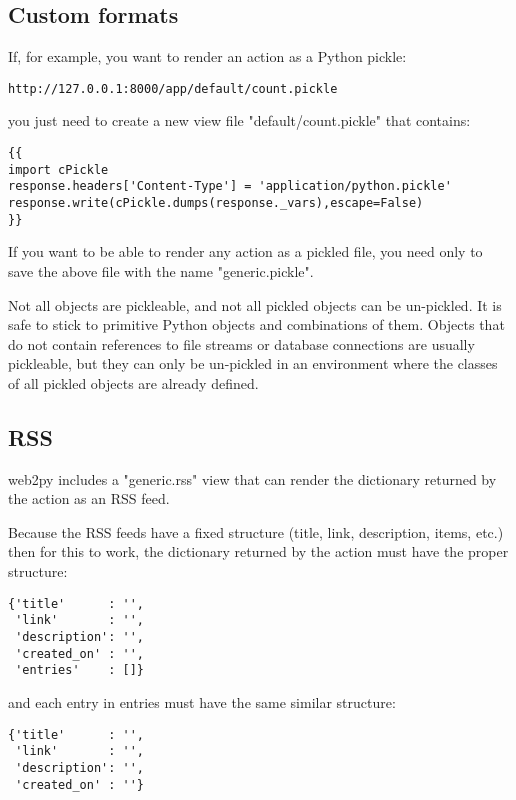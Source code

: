 \documentclass[justified,sixbynine,notoc]{tufte-book}
\def\inxx#1{\index{#1}}
\begin{document}
\begin{fullwidth}
\goodbreak\subsection{Custom formats}

If, for example, you want to render an action as a Python pickle:

\begin{lstlisting}[keywords={}]
http://127.0.0.1:8000/app/default/count.pickle
\end{lstlisting}
\noindent you just need to create a new view file "default/count.pickle" that contains:
\begin{lstlisting}[keywords={}]
{{
import cPickle
response.headers['Content-Type'] = 'application/python.pickle'
response.write(cPickle.dumps(response._vars),escape=False)
}}
\end{lstlisting}

If you want to be able to render any action as a pickled file, you need only to save the above file with the name "generic.pickle".

Not all objects are pickleable, and not all pickled objects can be un-pickled. It is safe to stick to primitive Python objects and combinations of them. Objects that do not contain references to file streams or database connections are usually pickleable, but they can only be un-pickled in an environment where the classes of all pickled objects are already defined.

\goodbreak\subsection{RSS}

\inxx{RSS}
\noindent web2py includes a "generic.rss" view that can render the dictionary returned by the action as an RSS feed.

Because the RSS feeds have a fixed structure (title, link, description, items, etc.) then for this to work, the dictionary returned by the action must have the proper structure:
\begin{lstlisting}
{'title'      : '',
 'link'       : '',
 'description': '',
 'created_on' : '',
 'entries'    : []}
\end{lstlisting}
\noindent and each entry in entries must have the same similar structure:

\begin{lstlisting}
{'title'      : '',
 'link'       : '',
 'description': '',
 'created_on' : ''}
\end{lstlisting}


\end{fullwidth}
\end{document}
